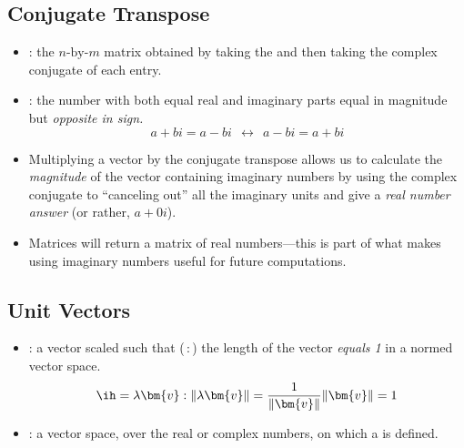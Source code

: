 \begin{itemize}
  \subsection{Conjugate Transpose}\label{Conjugate Transpose}
  \begin{itemize}
    \item {}: the \(n\text{-by-}m\) matrix obtained by taking the \hyperref[tbd]{} and then taking the complex conjugate of each entry.
    \item {}: the number with both equal real and imaginary parts equal in magnitude but \emph{opposite in sign.}
      \[%
      a+bi = a - bi~~\longleftrightarrow~~a - bi = a + bi
      \]%
      \vspace{-24pt}
    \item Multiplying a vector by the conjugate transpose allows us to calculate the \emph{magnitude} of the vector containing imaginary numbers by using the complex conjugate to ``canceling out'' all the imaginary units and give a \emph{real number answer} (or rather, \(a + 0i\)).
    \item Matrices will return a matrix of real numbers---this is part of what makes using imaginary numbers useful for future computations. 
  \end{itemize} 
  \vspace{12pt}
  \subsection{Unit Vectors}\label{Unit Vectors}
  \begin{itemize}
    \item {}: a vector scaled such that (\,:\,) the length of the vector \emph{equals 1} in a normed vector space.
    \[%
    \ih = \lambda \bm{v} : \| \lambda\bm{v} \| = \frac{1}{\| \bm{v} \|} \| \bm{v} \| = 1
    \]%
    \item {}: a vector space, over the real or complex numbers, on which a \hyperref[Vector Length]{} is defined.
  \end{itemize}
\end{itemize}

